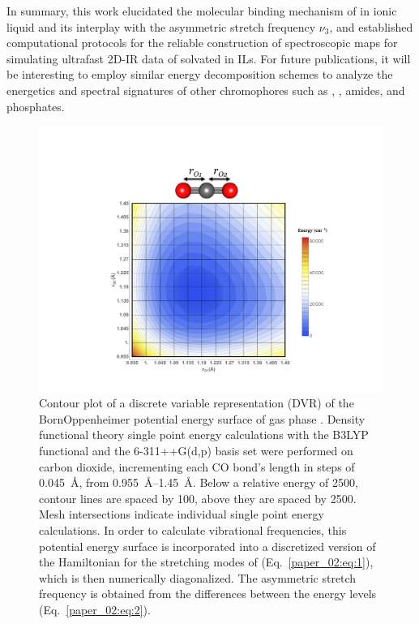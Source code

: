 In summary, this work elucidated the molecular binding mechanism of  in \ce{[C4C1im][PF6]} ionic liquid and its interplay with the  asymmetric stretch frequency \(\nu_{3}\), and established computational protocols for the reliable construction of spectroscopic maps for simulating ultrafast 2D-IR data of  solvated in ILs. For future publications, it will be interesting to employ similar energy decomposition schemes to analyze the energetics and spectral signatures of other chromophores such as , , amides, and phosphates.

\begin{figure}
  \centering
  \includegraphics[width=\textwidth]{paper_02/Fig1.pdf}
  \caption[DVR contour plot]{Contour plot of a discrete variable representation (DVR) of the Born\textendash{}Oppenheimer potential energy surface of gas phase . Density functional theory single point energy calculations with the B3LYP functional and the 6-311++G(d,p) basis set were performed on carbon dioxide, incrementing each CO bond's length in steps of \SI{0.045}{\angstrom}, from \SIrange{0.955}{1.45}{\angstrom}. Below a relative energy of \SI{2500}{\wavenumber}, contour lines are spaced by \SI{100}{\wavenumber}, above they are spaced by \SI{2500}{\wavenumber}. Mesh intersections indicate individual single point energy calculations. In order to calculate vibrational frequencies, this potential energy surface is incorporated into a discretized version of the Hamiltonian for the stretching modes of  (Eq.~\ref{paper_02:eq:1}), which is then numerically diagonalized. The asymmetric stretch frequency is obtained from the differences between the energy levels (Eq.~\ref{paper_02:eq:2}).}
  \label{paper_02:fig:1}
\end{figure}

